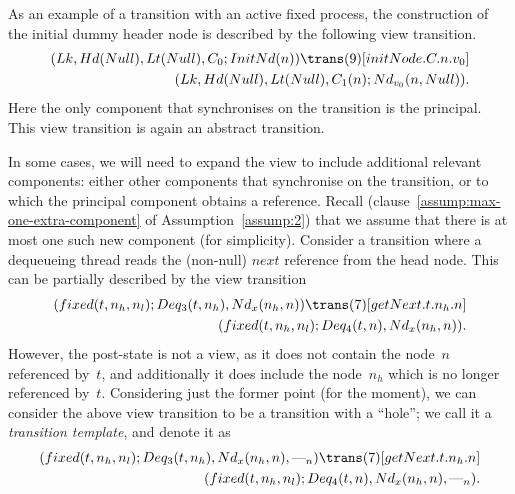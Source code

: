 
As an example of a transition with an active fixed process, the construction
of the initial dummy header node is described by the following view
transition.
\[
\begin{align}
(\Lock, \Head(Null), \Last(Null), \Con_0; \InitNode(n)) 
  \trans(9)[initNode.C.n.v_0] \\
\qquad (\Lock, \Head(Null), \Last(Null), \Con_1(n); \Node_{v_0}(n, Null)).
\end{align}
\]
Here the only component that synchronises on the transition is the principal.
This view transition is again an abstract transition.

In some cases, we will need to expand the view to include additional relevant
components: either other components that synchronise on the transition, or to
which the principal component obtains a reference.  Recall
(clause~\ref{assump:max-one-extra-component} of Assumption~\ref{assump:2})
that we assume that there is at most one such new component (for simplicity).
Consider a transition where a dequeueing thread reads the (non-null) $next$
reference from the head node.  This can be partially described by the view
transition
\[
\begin{align}
(fixed(t, n_h, n_l); Deq_3(t, n_h), \Node_x(n_h, n))
  \trans(7)[getNext.t.n_h.n] \\
\qquad (fixed(t, n_h, n_l); Deq_4(t, n), \Node_x(n_h, n)).
\end{align}
\]
However, the post-state is not a view, as it does not contain the node~$n$
referenced by~$t$, and additionally it does include the node~$n_h$ which is no
longer referenced by~$t$.  Considering just the former point (for the moment),
we can consider the above view transition to be a transition with a ``hole'';
we call it a \emph{transition template}, and denote it as
\[
\begin{align}
(fixed(t, n_h, n_l); Deq_3(t, n_h), \Node_x(n_h, n), \bighole{n})
  \trans(7)[getNext.t.n_h.n] \\
\qquad (fixed(t, n_h, n_l); Deq_4(t, n), \Node_x(n_h, n), \bighole{n}).
\end{align}
\]
